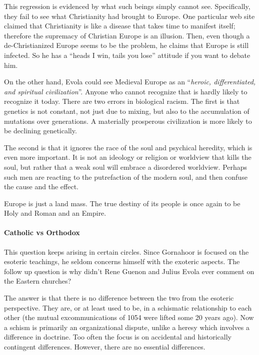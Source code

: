 This regression is evidenced by what such beings simply cannot see. Specifically, they fail to see what Christianity had brought to Europe. One particular web site claimed that Christianity is like a disease that takes time to manifest itself; therefore the supremacy of Christian Europe is an illusion. Then, even though a de-Christianized Europe seems to be the problem, he claims that Europe is still infected. So he has a ``heads I win, tails you lose'' attitude if you want to debate him.

On the other hand, Evola could see Medieval Europe as an ``\emph{heroic, differentiated, and spiritual civilization}''. Anyone who cannot recognize that is hardly likely to recognize it today. There are two errors in biological racism. The first is that genetics is not constant, not just due to mixing, but also to the accumulation of mutations over generations. A materially prosperous civilization is more likely to be declining genetically.

The second is that it ignores the race of the soul and psychical heredity, which is even more important. It is not an ideology or religion or worldview that kills the soul, but rather that a weak soul will embrace a disordered worldview. Perhaps such men are reacting to the putrefaction of the modern soul, and then confuse the cause and the effect.

Europe is just a land mass. The true destiny of its people is once again to be Holy and Roman and an Empire.

\paragraph{Catholic vs Orthodox}


This question keeps arising in certain circles. Since Gornahoor is focused on the esoteric teachings, he seldom concerns himself with the exoteric aspects. The follow up question is why didn't Rene Guenon and Julius Evola ever comment on the Eastern churches?

The answer is that there is no difference between the two from the esoteric perspective. They are, or at least used to be, in a schismatic relationship to each other (the mutual excommunications of 1054 were lifted some 20 years ago). Now a schism is primarily an organizational dispute, unlike a heresy which involves a difference in doctrine. Too often the focus is on accidental and historically contingent differences. However, there are no essential differences.

